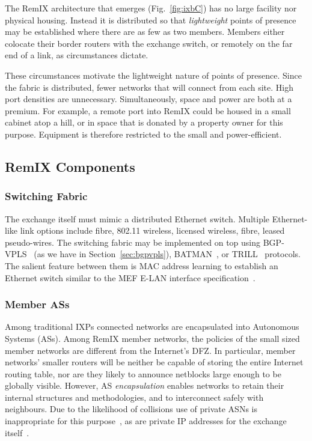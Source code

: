 The RemIX architecture that emerges (Fig.~\ref{fig:ixbC})
has no large facility nor physical housing. Instead it is
distributed so that \emph{lightweight} points of presence may be established
where there are as few as two members. Members either colocate their border
routers with the exchange switch, or remotely on the far end of a link, as
circumstances dictate.

These circumstances motivate the lightweight nature of points of presence.
Since the fabric is distributed, fewer networks that will connect from each
site. High port densities are unnecessary. Simultaneously, space and power are
both at a premium. For example, a remote port into RemIX could be housed in a
small cabinet atop a hill, or in space that is donated by a property owner for
this purpose. Equipment is therefore restricted to the small and
power-efficient.


\subsection{RemIX Components}

\subsubsection{Switching Fabric}

The exchange itself must mimic a distributed Ethernet switch. Multiple
Ethernet-like link options include fibre, 802.11 wireless, licensed wireless, fibre, leased pseudo-wires. The switching fabric may be implemented on
top using \acs{BGP}-\acs{VPLS}~\cite{rfc4761} (as we have in
Section~\ref{sec:bgpvpls}),
\acs{BATMAN}~\cite{johnson2008simple}, or
\acs{TRILL}~\cite{perlman2004rbridges} protocols. The salient feature
between them is MAC address learning to establish an Ethernet switch
similar to the \ac{MEF} E-LAN interface
specification~\cite{mef62}.%

\subsubsection{Member \acp{AS}}

Among traditional \acp{IXP} connected networks are encapsulated into
Autonomous Systems (\acp{AS}). Among RemIX member networks, the
policies of the small sized member networks are
different from the Internet's \ac{DFZ}. In particular, member
networks' smaller routers will be neither be capable of storing the
entire Internet routing table, nor are they likely to announce
netblocks large enough to be globally visible.  However, \ac{AS}
\emph{encapsulation} enables networks to retain their internal
structures and methodologies, and to interconnect safely  with
neighbours. Due to the likelihood of collisions use of private
\acp{ASN} is inappropriate for this purpose~\cite{rfc6996}, as are
private IP addresses for the exchange itself~\cite{rfc1918}.

